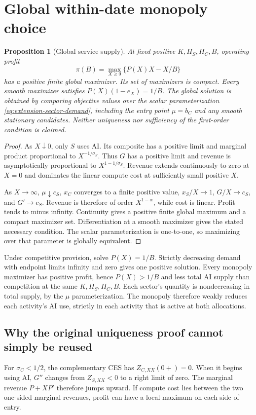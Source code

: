 \documentclass[11pt]{article}
\newtheorem{proposition}{Proposition}
\begin{document}
\section{Global within-date monopoly choice}
\begin{proposition}[Global service supply]
At fixed positive $K,H_S,H_C,B$, operating profit
\begin{equation}
 \pi(B)=\max_{X\geq0}\{P(X)X-X/B\}
 \label{eq:extension-monopoly}
\end{equation}
has a positive finite global maximizer. Its set of maximizers is compact.
Every smooth maximizer satisfies $P(X)(1-e_X)=1/B$.
The global solution is obtained by comparing objective values over the
scalar parameterization \eqref{eq:extension-sector-demand}, including
the entry point $\mu=b_C$ and any smooth stationary candidates.
Neither uniqueness nor sufficiency of the first-order condition is claimed.
\end{proposition}
\begin{proof}
As $X\downarrow0$, only $S$ uses AI. Its composite has a positive limit
and marginal product proportional to $X^{-1/\sigma_S}$. Thus $G$ has
a positive limit and revenue is asymptotically proportional to
$X^{1-1/\sigma_S}$. Revenue extends continuously to zero at $X=0$ and
dominates the linear compute cost at sufficiently small positive $X$.

As $X\to\infty$, $\mu\downarrow c_S$, $x_C$ converges to a finite
positive value, $x_S/X\to1$, $G/X\to c_S$, and $G'\to c_S$.
Revenue is therefore of order $X^{1-\alpha}$, while cost is linear.
Profit tends to minus infinity. Continuity gives a positive finite global
maximum and a compact maximizer set. Differentiation at a smooth maximizer
gives the stated necessary condition. The scalar parameterization is
one-to-one, so maximizing over that parameter is globally equivalent.
\end{proof}

Under competitive provision, solve $P(X)=1/B$. Strictly decreasing demand
with endpoint limits infinity and zero gives one positive solution.
Every monopoly maximizer has positive profit, hence $P(X)>1/B$ and less
total AI supply than competition at the same $K,H_S,H_C,B$.
Each sector's quantity is nondecreasing in total supply, by the $\mu$
parameterization. The monopoly therefore weakly reduces each activity's
AI use, strictly in each activity that is active at both allocations.

\subsection{Why the original uniqueness proof cannot simply be reused}
For $\sigma_C<1/2$, the complementary CES has $Z_{C,XX}(0+)=0$.
When it begins using AI, $G''$ changes from $Z_{S,XX}<0$ to a right
limit of zero. The marginal revenue $P+XP'$ therefore jumps upward.
If compute cost lies between the two one-sided marginal revenues,
profit can have a local maximum on each side of entry.
\end{document}
